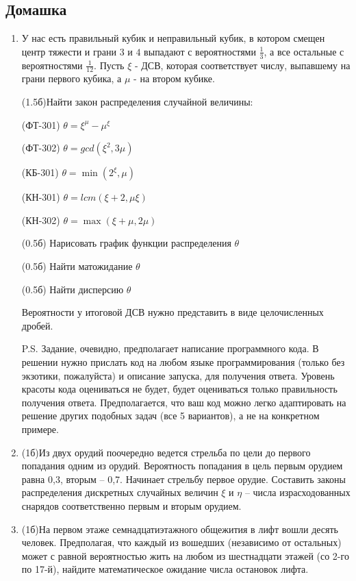 \documentclass[a4paper, 14pt]{extarticle}
\begin{document}
\subsection*{Домашка}
\begin{enumerate}
\item У нас есть правильный кубик и неправильный кубик, в котором смещен центр тяжести и грани $3$ и $4$ выпадают с вероятностями $\frac{1}{3}$, а все остальные с вероятностями $\frac{1}{12}$. Пусть $\xi$ - ДСВ, которая соответствует числу, выпавшему на грани первого кубика, а $\mu$ - на втором кубике.

(1.5б)Найти закон распределения случайной величины:

(ФТ-301) $\theta = \xi^\mu - \mu^\xi$

(ФТ-302) $\theta = gcd(\xi^2,3 \mu)$

(КБ-301) $\theta = \min(2^\xi,\mu)$

(КН-301) $\theta = lcm(\xi+2,\mu\xi)$

(КН-302) $\theta = \max(\xi + \mu,2\mu)$

(0.5б) Нарисовать график функции распределения $\theta$

(0.5б) Найти матожидание $\theta$

(0.5б) Найти дисперсию $\theta$

Вероятности у итоговой ДСВ нужно представить в виде целочисленных дробей.

P.S. Задание, очевидно, предполагает написание программного кода. В решении нужно прислать код на любом языке программирования (только без экзотики, пожалуйста) и описание запуска, для получения ответа. Уровень красоты кода оцениваться не будет, будет оцениваться только правильность получения ответа. Предполагается, что ваш код можно легко адаптировать на решение других подобных задач (все 5 вариантов), а не на конкретном примере.

\item (1б)Из двух орудий поочередно ведется стрельба по
	цели до первого попадания одним из орудий. Вероятность
	попадания в цель первым орудием равна 0,3, вторым -- 0,7.
	Начинает стрельбу первое орудие. Составить законы 
	распределения дискретных случайных величин $\xi$ и $\eta$ -- числа
	израсходованных снарядов соответственно первым и 
	вторым орудием.

\item (1б)На первом этаже семнадцатиэтажного общежития в лифт вошли
	десять человек. Предполагая, что каждый из вошедших (независимо
	от остальных) может с равной вероятностью жить на любом из шестнадцати этажей (со 2-го по 17-й), найдите математическое ожидание
	числа остановок лифта.
\end{enumerate}
\end{document}
